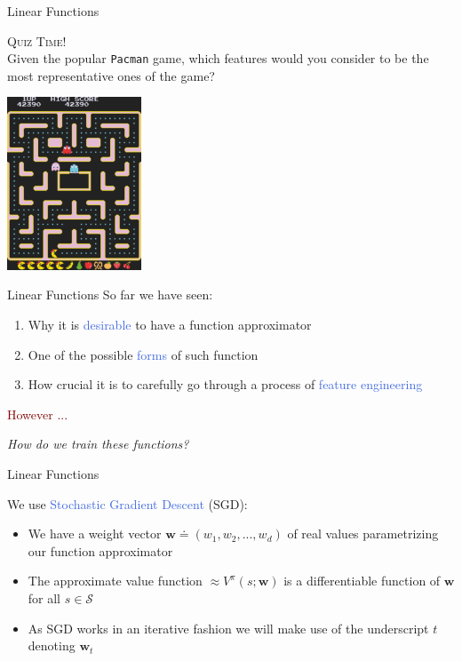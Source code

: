 \documentclass{beamer}
\newenvironment{takeaway}[1]{%
	\definecolor{shadecolor}{gray}{0.9}%
		\begin{shaded}{\color{skymagenta}\noindent\textsc{#1}}\\%
		}{%
		\end{shaded}%
}
\begin{document}
\begin{frame}{Linear Functions}
	\begin{takeaway}{Quiz Time!}
		Given the popular \texttt{Pacman} game, which features would you consider to be the most representative ones of the game?
	
	\end{takeaway}
	\begin{center}
		\includegraphics[width=4cm]{./Images/p}
	\end{center}

\end{frame}

\begin{frame}{Linear Functions}
	So far we have seen:
	\begin{enumerate}
		\item Why it is \textcolor{RoyalBlue}{desirable} to have a function approximator
		\item One of the possible \textcolor{RoyalBlue}{forms} of such function 
		\item How crucial it is to carefully go through a process of \textcolor{RoyalBlue}{feature engineering} 
	\end{enumerate}
	\bigskip

	\centering

	\textcolor{Maroon}{However ...}

	\bigskip
	\textit{How do we train these functions?}

\end{frame}

\begin{frame}{Linear Functions}
	\begin{center}
		We use \textcolor{RoyalBlue}{Stochastic Gradient Descent} (SGD):
	\end{center}
	
	\bigskip

	\begin{itemize}
		\item We have a weight vector $\mathbf{w}\doteq(w_1, w_2, ..., w_d)$ of real values parametrizing our function approximator
		\item The approximate value function $\approx V^{\pi}(s;\mathbf{w})$ is a differentiable function of $\mathbf{w}$ for all $s\in\mathcal{S}$
		\item As SGD works in an iterative fashion we will make use of the underscript $t$ denoting $\mathbf{w}_t$
	\end{itemize}
\end{frame}
\end{document}
